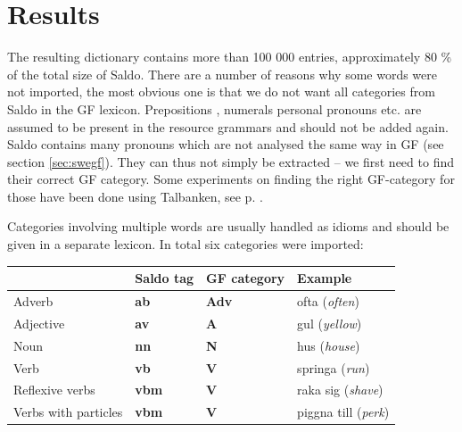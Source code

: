 \documentclass{report}
\begin{document}


\section{Results}
\label{sec:saldoRes}
The resulting dictionary contains more than 100 000 entries, approximately 80 \% 
of the total size of Saldo.
There are a number of reasons why some words were not imported,
the most obvious one is that we do not want all categories from
Saldo in the GF lexicon. Prepositions %
, numerals %
personal pronouns etc.
are assumed to be present in the resource grammars and should not be added again.
Saldo contains many pronouns which
are not analysed the same way in GF (see section \ref{sec:swegf}).
They can thus not simply be extracted -- we first need to find their correct GF category.
Some experiments on finding
the right GF-category for those have been done using Talbanken, see p. \pageref{sec:gf.quant}.

Categories involving multiple words %
are usually handled as idioms and should be given in a separate lexicon. In
total six categories were imported: \\

\begin{tabular}{|l|lll|}
\hline
& Saldo tag & GF category & Example \\
\hline
 Adverb & \textbf{ab} &\textbf{Adv} & ofta (\emph{often})\\
 Adjective&\textbf{av} &    \textbf{A} & gul (\emph{yellow})\\
 Noun & \textbf{nn} &\textbf{N} & hus (\emph{house})\\
 Verb & \textbf{vb} &\textbf{V} & springa (\emph{run})\\
 Reflexive verbs  &\textbf{vbm}& \textbf{V} & raka sig (\emph{shave})\\
 Verbs with particles &\textbf{vbm}& \textbf{V}  &  piggna till (\emph{perk})\\
\hline
\end{tabular}\\
\end{document}
